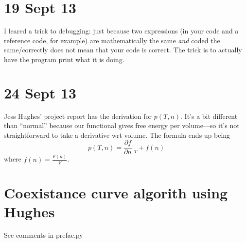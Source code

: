 \documentclass{article}
\begin{document}
\begin{sffamily}
\section*{19 Sept 13}
I leared a trick to debugging: just because two expressions (in your
code and a reference code, for example) are mathematically the same
\textit{and} coded the same/correctly does not mean that your code is
correct. The trick is to actually have the program print what it is
doing.

\section*{24 Sept 13}
Jess Hughes' project report has the derivation for $p(T,n)$. It's a
bit different than ``normal'' because our functional gives free energy
per volume---so it's not straightforward to take a derivative wrt
volume. The formula ends up being
\begin{equation*}
  p(T,n) = \frac{\partial f}{\partial n}\bigg|_T + f(n)
\end{equation*}
where $f(n) = \tfrac{F(n)}{V}$.

\section*{Coexistance curve algorith using Hughes}
See comments in prefac.py



\end{sffamily}
\end{document}

